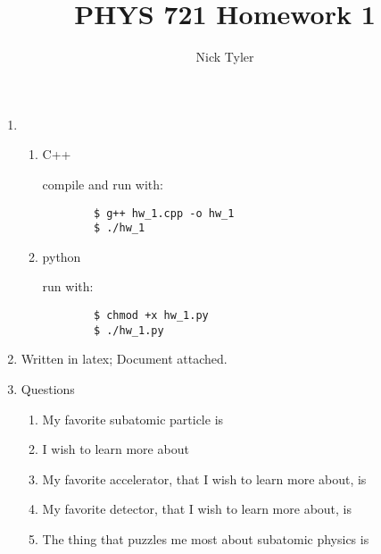 \documentclass[pdftex]{article}
\title{PHYS 721 Homework 1}
\author{Nick Tyler}
\date{}
\begin{document}
\maketitle
\begin{enumerate}
	\item 
	\begin{enumerate}
		\item C++
		
		compile and run with:
		\begin{verbatim}
		$ g++ hw_1.cpp -o hw_1
		$ ./hw_1
		\end{verbatim}

		\item python
		
		run with:
		\begin{verbatim}
		$ chmod +x hw_1.py
		$ ./hw_1.py
		\end{verbatim}
	\end{enumerate}
	\item Written in latex; Document attached.
	\item Questions
	\begin{enumerate}
		\item My favorite subatomic particle is 
		\item I wish to learn more about 
		\item My favorite accelerator, that I wish to learn more about, is 
		\item My favorite detector, that I wish to learn more about, is
		\item The thing that puzzles me most about subatomic physics is
	\end{enumerate}

\end{enumerate}
\end{document}
